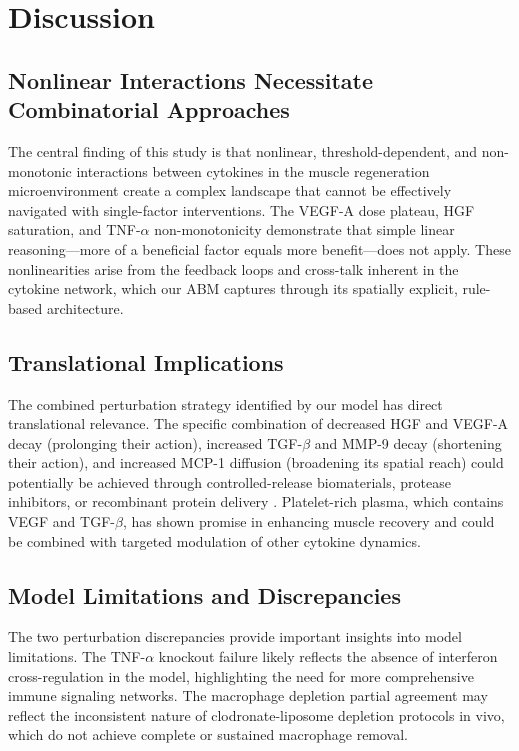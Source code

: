 \documentclass[11pt]{article}
\begin{document}
\section{Discussion}

\subsection{Nonlinear Interactions Necessitate Combinatorial Approaches}

The central finding of this study is that nonlinear, threshold-dependent, and non-monotonic interactions between cytokines in the muscle regeneration microenvironment create a complex landscape that cannot be effectively navigated with single-factor interventions. The VEGF-A dose plateau, HGF saturation, and TNF-$\alpha$ non-monotonicity demonstrate that simple linear reasoning---more of a beneficial factor equals more benefit---does not apply. These nonlinearities arise from the feedback loops and cross-talk inherent in the cytokine network, which our ABM captures through its spatially explicit, rule-based architecture.

\subsection{Translational Implications}

The combined perturbation strategy identified by our model has direct translational relevance. The specific combination of decreased HGF and VEGF-A decay (prolonging their action), increased TGF-$\beta$ and MMP-9 decay (shortening their action), and increased MCP-1 diffusion (broadening its spatial reach) could potentially be achieved through controlled-release biomaterials, protease inhibitors, or recombinant protein delivery \citep{grasman2015biomimetic}. Platelet-rich plasma, which contains VEGF and TGF-$\beta$, has shown promise in enhancing muscle recovery and could be combined with targeted modulation of other cytokine dynamics.

\subsection{Model Limitations and Discrepancies}

The two perturbation discrepancies provide important insights into model limitations. The TNF-$\alpha$ knockout failure likely reflects the absence of interferon cross-regulation in the model, highlighting the need for more comprehensive immune signaling networks. The macrophage depletion partial agreement may reflect the inconsistent nature of clodronate-liposome depletion protocols in vivo, which do not achieve complete or sustained macrophage removal.
\end{document}

